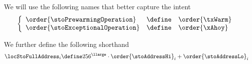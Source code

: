 \saNote{}
We will use the following names that better capture the intent
\[
	\left\{ \begin{array}{lcl}
		\order{\stoPrewarmingOperation}  & \define & \order{\txWarm} \\
                \order{\stoExceptionalOperation} & \define & \order{\xAhoy}  \\
	\end{array} \right.
\]

We further define the following shorthand
\[
	\locStoFullAddress_{i}
	\define
	256^\llarge \cdot \order{\stoAddressHi}_{i} + \order{\stoAddressLo}_{i}
\]
